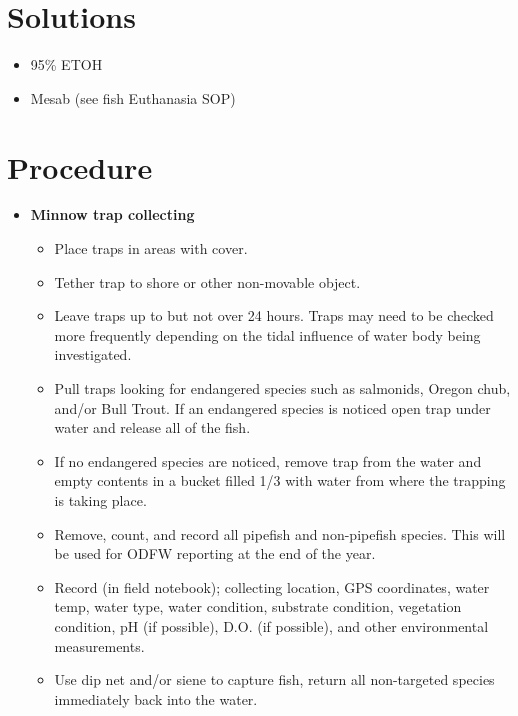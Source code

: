 \documentclass[
  letterpaper,
  DIV=11,
  numbers=noendperiod]{scrreprt}
\providecommand{\tightlist}{%
  \setlength{\itemsep}{0pt}\setlength{\parskip}{0pt}}\usepackage{longtable,booktabs,array}
\begin{document}
\hypertarget{solutions-36}{%
\section{Solutions}\label{solutions-36}}

\begin{itemize}
\tightlist
\item
  95\% ETOH
\item
  Mesab (see fish Euthanasia SOP)
\end{itemize}

\hypertarget{procedure-39}{%
\section{Procedure}\label{procedure-39}}

\begin{itemize}
\tightlist
\item
  \textbf{Minnow trap collecting}

  \begin{itemize}
  \tightlist
  \item
    Place traps in areas with cover.
  \item
    Tether trap to shore or other non-movable object.
  \item
    Leave traps up to but not over 24 hours. Traps may need to be
    checked more frequently depending on the tidal influence of water
    body being investigated.
  \item
    Pull traps looking for endangered species such as salmonids, Oregon
    chub, and/or Bull Trout. If an endangered species is noticed open
    trap under water and release all of the fish.
  \item
    If no endangered species are noticed, remove trap from the water and
    empty contents in a bucket filled 1/3 with water from where the
    trapping is taking place.
  \item
    Remove, count, and record all pipefish and non-pipefish species.
    This will be used for ODFW reporting at the end of the year.
  \item
    Record (in field notebook); collecting location, GPS coordinates,
    water temp, water type, water condition, substrate condition,
    vegetation condition, pH (if possible), D.O. (if possible), and
    other environmental measurements.
  \item
    Use dip net and/or siene to capture fish, return all non-targeted
    species immediately back into the water.
  \end{itemize}
\end{itemize}
\end{document}
